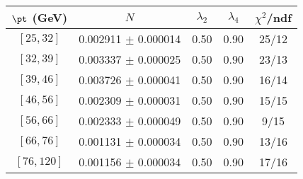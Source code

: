 \begin{tabular}{c||c|c|c|c}
$\pt$ (GeV) & $N$ & $\lambda_{2}$ & $\lambda_4$  & $\chi^2$/ndf  \\
\hline
$[25, 32]$ & 0.002911 $\pm$ 0.000014 & 0.50 & 0.90 & 25/12\\
$[32, 39]$ & 0.003337 $\pm$ 0.000025 & 0.50 & 0.90 & 23/13\\
$[39, 46]$ & 0.003726 $\pm$ 0.000041 & 0.50 & 0.90 & 16/14\\
$[46, 56]$ & 0.002309 $\pm$ 0.000031 & 0.50 & 0.90 & 15/15\\
$[56, 66]$ & 0.002333 $\pm$ 0.000049 & 0.50 & 0.90 & 9/15\\
$[66, 76]$ & 0.001131 $\pm$ 0.000034 & 0.50 & 0.90 & 13/16\\
$[76, 120]$ & 0.001156 $\pm$ 0.000034 & 0.50 & 0.90 & 17/16\\
\end{tabular}
